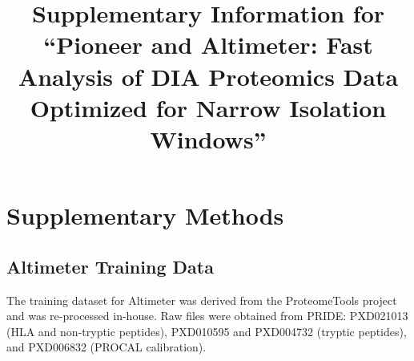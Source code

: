 \documentclass[pdflatex,sn-nature]{sn-jnl}
\begin{document}
\title[Supplementary Information]{Supplementary Information for ``Pioneer and Altimeter: Fast Analysis of DIA Proteomics Data Optimized for Narrow Isolation Windows''}

\author[1]{ }
\author[1]{ }
\author[1,2]{ }
\author*[1,3]{ }


\maketitle





\section{Supplementary Methods}\label{sec:supplementary-methods}

\subsection{Altimeter Training Data}\label{subsec:altimeter-training-data}
The training dataset for Altimeter was derived from the ProteomeTools project and was re-processed in-house. Raw files were obtained from PRIDE: PXD021013 (HLA and non-tryptic peptides), PXD010595 and PXD004732 (tryptic peptides), and PXD006832 (PROCAL calibration).

\end{document}

